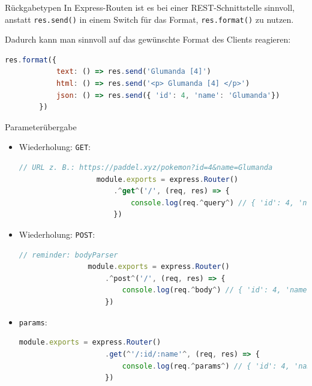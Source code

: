 \begin{bonus}{Rückgabetypen}
    In Express-Routen ist es bei einer REST-Schnittstelle sinnvoll, anstatt \texttt{res.send()} in einem Switch für das Format, \texttt{res.format()} zu nutzen.

    Dadurch kann man sinnvoll auf das gewünschte Format des Clients reagieren:

    \begin{lstlisting}[language=JavaScript]
        res.format({
            text: () => res.send('Glumanda [4]')
            html: () => res.send('<p> Glumanda [4] </p>')
            json: () => res.send({ 'id': 4, 'name': 'Glumanda'})
        })
    \end{lstlisting}
\end{bonus}

\begin{bonus}{Parameterübergabe}
    \begin{itemize}
        \item Wiederholung: \texttt{GET}:

              \begin{lstlisting}[language=JavaScript]
                  // URL z. B.: https://paddel.xyz/pokemon?id=4&name=Glumanda
                  module.exports = express.Router()
                      .^get^('/', (req, res) => {
                          console.log(req.^query^) // { 'id': 4, 'name': 'Glumanda' }
                      })
              \end{lstlisting}
        \item Wiederholung: \texttt{POST}:

              \begin{lstlisting}[language=JavaScript]
                // reminder: bodyParser
                module.exports = express.Router()
                    .^post^('/', (req, res) => {
                        console.log(req.^body^) // { 'id': 4, 'name': 'Glumanda' }
                    })
            \end{lstlisting}
        \item \texttt{params}:

              \begin{lstlisting}[language=JavaScript]
                module.exports = express.Router()
                    .get(^'/:id/:name'^, (req, res) => {
                        console.log(req.^params^) // { 'id': 4, 'name': 'Glumanda' }
                    })
            \end{lstlisting}
    \end{itemize}
\end{bonus}

